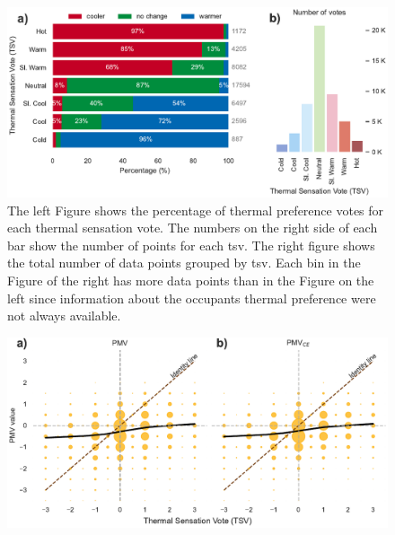 \begin{figure}
    \centering
    \includegraphics[width=\textwidth]{figures/bar_plot_tp_by_ts}
    \caption{The left Figure shows the percentage of thermal preference votes for each thermal sensation vote.
    The numbers on the right side of each bar show the number of points for each \ac{tsv}.
    The right figure shows the total number of data points grouped by \ac{tsv}.
    Each bin in the Figure of the right has more data points than in the Figure on the left since information about the occupants thermal preference were not always available.}
    \label{fig:bar_plot_tp_by_ts}
\end{figure}

\begin{figure}
    \centering
    \includegraphics[width=\textwidth]{figures/bubble_models_vs_tsv}
    \caption{}
    \label{fig:bubble_models_vs_tsv}
\end{figure}